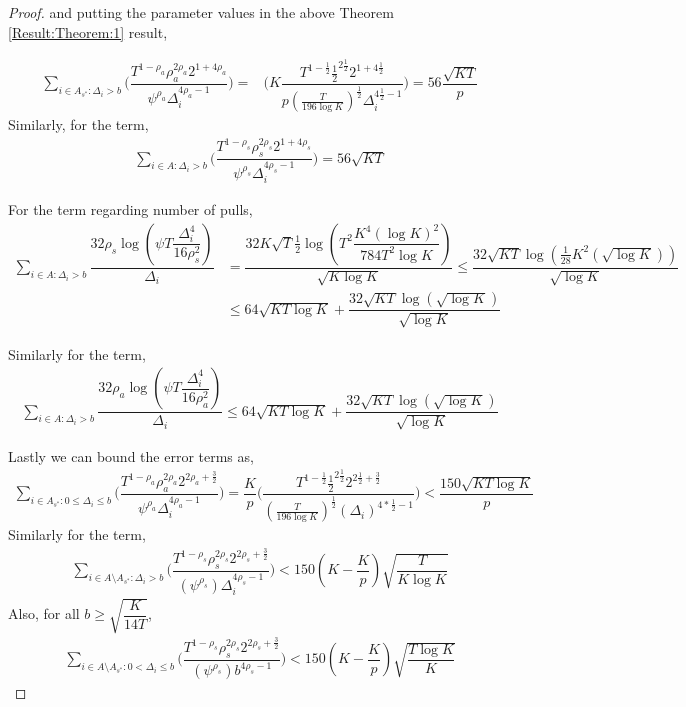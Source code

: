 \begin{proof}
and putting the parameter values in the above Theorem \ref{Result:Theorem:1} result,	
	
	\begin{align*}
	\sum_{i\in A_{s^{*}}:\Delta_{i} > b}\bigg(\dfrac{T^{1-\rho_{a}}\rho_{a}^{2\rho_{a}}2^{1+4\rho_{a}}}{\psi^{\rho_{a}}\Delta_{i}^{4\rho_{a}-1}} \bigg)=& \bigg(K\dfrac{T^{1-\frac{1}{2}}\frac{1}{2}^{2\frac{1}{2}}2^{1+4\frac{1}{2}}}{p(\frac{T}{196 \log K})^{\frac{1}{2}}\Delta_{i}^{4\frac{1}{2}-1}} \bigg)=56\dfrac{\sqrt{KT}}{p}
	\end{align*}		
	 Similarly, for the term, 
	 \begin{align*}
	 \sum_{i\in A:\Delta_{i} > b}\bigg(\dfrac{T^{1-\rho_{s}}\rho_{s}^{2\rho_{s}}2^{1+4\rho_{s}}}{\psi^{\rho_{s}}\Delta_{i}^{4\rho_{s}-1}} \bigg) = 56\sqrt{KT}
	 \end{align*}
	 
	
	For the term regarding number of pulls,
	\begin{align*}
	\sum_{i\in A:\Delta_{i} > b}\dfrac{32\rho_{s}\log{(\psi T\dfrac{\Delta_{i}^{4}}{16\rho_{s}^{2}})}}{\Delta_{i}} &= \dfrac{32K\sqrt{T}\frac{1}{2}\log{(T^{2}\dfrac{K^{4}(\log K)^{2}}{784 T^{2}\log K})}}{\sqrt{K\log K}} \leq  \dfrac{32\sqrt{KT}\log{(\frac{1}{28} K^{2}(\sqrt{\log K}))}}{\sqrt{\log K}}\\
	&\leq 64\sqrt{KT\log K} + \dfrac{32\sqrt{KT}\log{(\sqrt{\log K})}}{\sqrt{\log K}}
	\end{align*}		
	
	Similarly for the term,
	\begin{align*}
	\sum_{i\in A:\Delta_{i} > b}\dfrac{32\rho_{a}\log{(\psi T\dfrac{\Delta_{i}^{4}}{16\rho_{a}^{2}})}}{\Delta_{i}} \leq 64\sqrt{KT\log K} + \dfrac{32\sqrt{KT}\log{(\sqrt{\log K})}}{\sqrt{\log K}}
	\end{align*}		
	
 	Lastly we can bound the error terms as, 
	\begin{align*}
	\sum\limits_{i\in A_{s^{*}}:0\leq\Delta_{i}\leq b}\bigg(\dfrac{T^{1-\rho_{a}}\rho_{a}^{2\rho_{a}}2^{2\rho_{a}+\frac{3}{2}}}{\psi^{\rho_{a}}\Delta_{i}^{4\rho_{a}-1}} \bigg)=\dfrac{K}{p}\bigg(\dfrac{T^{1-\frac{1}{2}}\frac{1}{2}^{2\frac{1}{2}}2^{2\frac{1}{2}+\frac{3}{2}}}{{(\frac{T}{196 \log K})^{\frac{1}{2}}}{(\Delta_{i})^{4*\frac{1}{2}-1}}} \bigg) < \dfrac{150 \sqrt{KT\log K} }{p}
	\end{align*}	 	
 	Similarly for the term,
 	\begin{align*}
 	\sum_{i\in A\setminus A_{s^*}: \Delta_{i} > b}\bigg(\dfrac{T^{1-\rho_{s}}\rho_{s}^{2\rho_{s}}2^{2\rho_{s}+\frac{3}{2}}}{(\psi^{\rho_{s}})\Delta_{i}^{4\rho_{s} -1}} \bigg) < 150(K-\dfrac{K}{p})\sqrt{\dfrac{T}{K\log K}}
	\end{align*} 	
	Also, for all $b\geq \sqrt{\dfrac{K}{14T}}$,
	\begin{align*}
 	\sum_{i\in A\setminus A_{s^*}: 0 < \Delta_{i} \leq b}\bigg(\dfrac{T^{1-\rho_{s}}\rho_{s}^{2\rho_{s}}2^{2\rho_{s}+\frac{3}{2}}}{(\psi^{\rho_{s}})b^{4\rho_{s} -1}} \bigg) < 150(K-\dfrac{K}{p})\sqrt{\dfrac{T\log K}{K}}
	\end{align*} 	
	

\end{proof}
